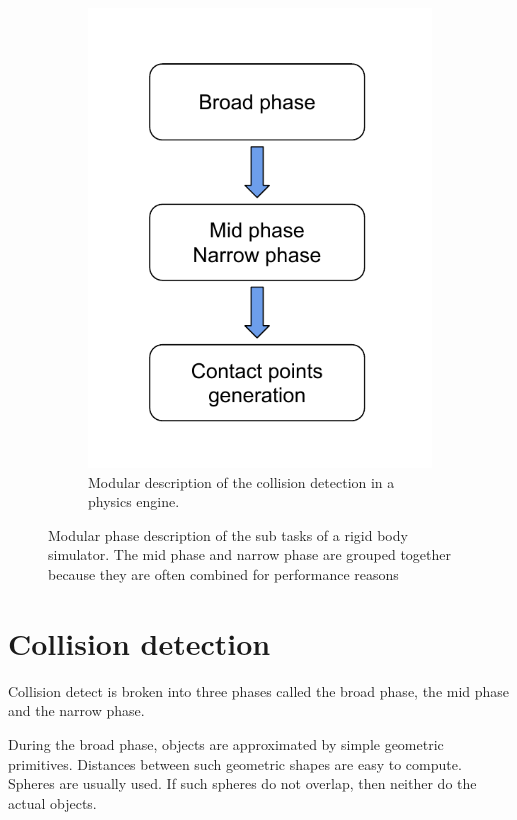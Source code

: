 \begin{figure}[htp]
\begin{subfigure}[b]{0.47\textwidth}
	\includegraphics[width=\textwidth]{figures/STAR_collision}
	\caption[Collision detection]{Modular description of the collision detection in a physics engine.}
	\label{fig:star_collision}
\end{subfigure}
\caption[Modular phase description of the sub tasks of a rigid body simulator]{Modular phase description of the sub tasks of a rigid body simulator. The mid phase and narrow phase are grouped together because they are often combined for performance reasons}
\label{fig:phase_simul}
\end{figure}

\section{Collision detection}
Collision detect is broken into three phases called the broad phase, the mid phase and the narrow phase. 

During the broad phase, objects are approximated by simple geometric primitives. Distances between such geometric shapes are easy to compute. Spheres are usually used. If such spheres do not overlap, then neither do the actual objects.

